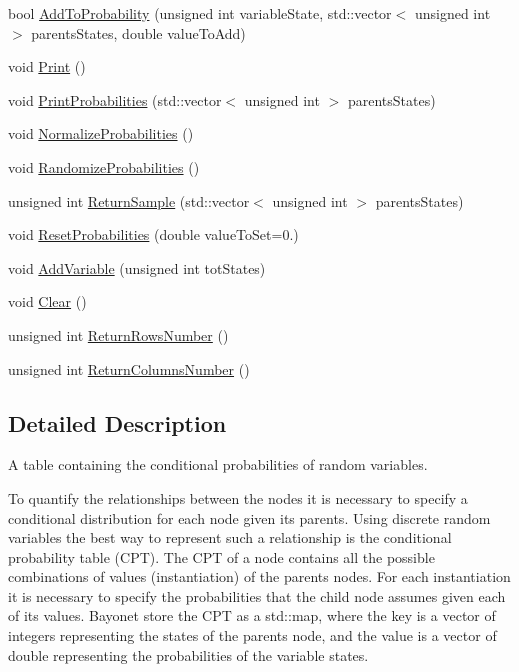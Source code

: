 \begin{DoxyCompactItemize}
bool \hyperlink{classbayonet_1_1_conditional_probability_table_a8f0c8eced14e22be7b235b02825b732e}{Add\-To\-Probability} (unsigned int variable\-State, std\-::vector$<$ unsigned int $>$ parents\-States, double value\-To\-Add)
\item 
void \hyperlink{classbayonet_1_1_conditional_probability_table_a0815f7814cc5797629035f17f0cf26c2}{Print} ()
\item 
void \hyperlink{classbayonet_1_1_conditional_probability_table_a0ca5c1cbfeb5c86ef06161a810233b2a}{Print\-Probabilities} (std\-::vector$<$ unsigned int $>$ parents\-States)
\item 
void \hyperlink{classbayonet_1_1_conditional_probability_table_a600256d28edeef688ab4cdf38794acc3}{Normalize\-Probabilities} ()
\item 
void \hyperlink{classbayonet_1_1_conditional_probability_table_a224d882019f784a993c50043dca4cb5d}{Randomize\-Probabilities} ()
\item 
unsigned int \hyperlink{classbayonet_1_1_conditional_probability_table_a3e600c4b5247dd52a5d0e775ca898c69}{Return\-Sample} (std\-::vector$<$ unsigned int $>$ parents\-States)
\item 
void \hyperlink{classbayonet_1_1_conditional_probability_table_afc68c2346315d6aa43d71e549392f09a}{Reset\-Probabilities} (double value\-To\-Set=0.)
\item 
void \hyperlink{classbayonet_1_1_conditional_probability_table_a038e1940c40528ac23101272f33f752c}{Add\-Variable} (unsigned int tot\-States)
\item 
void \hyperlink{classbayonet_1_1_conditional_probability_table_a1708d2e94833fe8e0c37e661269dc11d}{Clear} ()
\item 
unsigned int \hyperlink{classbayonet_1_1_conditional_probability_table_ae2b35a361fb92684abdfde96887b24e6}{Return\-Rows\-Number} ()
\item 
unsigned int \hyperlink{classbayonet_1_1_conditional_probability_table_a2fef41dbe55cbccc82b3921d4d471c1d}{Return\-Columns\-Number} ()
\end{DoxyCompactItemize}


\subsection{Detailed Description}
A table containing the conditional probabilities of random variables. 

To quantify the relationships between the nodes it is necessary to specify a conditional distribution for each node given its parents. Using discrete random variables the best way to represent such a relationship is the conditional probability table (C\-P\-T). The C\-P\-T of a node contains all the possible combinations of values (instantiation) of the parents nodes. For each instantiation it is necessary to specify the probabilities that the child node assumes given each of its values. Bayonet store the C\-P\-T as a std\-::map, where the key is a vector of integers representing the states of the parents node, and the value is a vector of double representing the probabilities of the variable states. 


